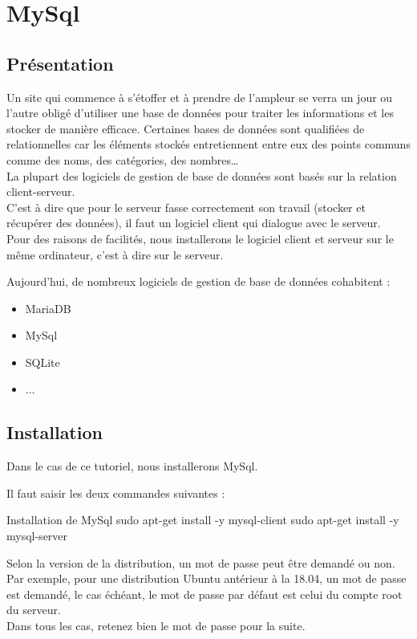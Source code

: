 
\chapter{MySql}

\section{Présentation}
Un site qui commence à s’étoffer et à prendre de l’ampleur se verra un jour ou l’autre obligé d’utiliser une base de données pour traiter les informations et les stocker de manière efficace. 
Certaines  bases de données sont qualifiées de relationnelles car les éléments stockés entretiennent entre eux des points communs comme des noms, des catégories, des nombres… \\

La plupart des logiciels de gestion de base de données sont basés sur la relation client-serveur.\\
C’est à dire que pour le serveur fasse correctement son travail (stocker et récupérer des données), il faut un logiciel client qui dialogue avec le serveur. \\
Pour des raisons de facilités, nous installerons le logiciel client et serveur sur le même ordinateur, c'est à dire sur le serveur.

Aujourd’hui, de nombreux logiciels de gestion de base de données cohabitent : 

\begin{itemize}
    \item MariaDB
    \item MySql
    \item SQLite
    \item ...
\end{itemize}

\section{Installation}
Dans le cas de ce tutoriel, nous installerons MySql.

Il faut saisir les deux commandes suivantes : 

\begin{Bash}{Installation de MySql}
sudo apt-get install -y mysql-client
sudo apt-get install -y mysql-server
\end{Bash}

Selon la version de la distribution, un mot de passe peut être demandé ou non.
Par exemple, pour une distribution Ubuntu antérieur à la 18.04, un mot de passe est demandé, le cas échéant, le mot de passe par défaut est celui du compte root du serveur. \\
Dans tous les cas, retenez bien le mot de passe pour la suite.

